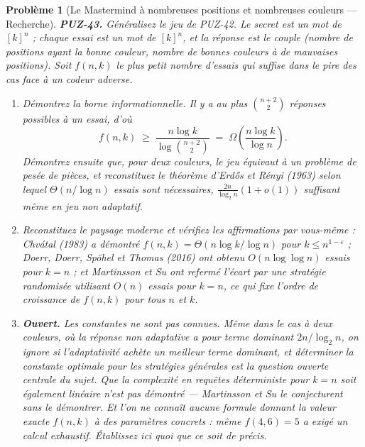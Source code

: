 \documentclass[11pt]{article}
\newtheorem{problem}{Problème}
\begin{document}
\begin{problem}[{Le Mastermind à nombreuses positions et nombreuses couleurs --- Recherche}]
\textbf{PUZ-43.} Généralisez le jeu de PUZ-42. Le secret est un mot de $ [k]^{n} $ ;
chaque essai est un mot de $ [k]^{n} $, et la réponse est le couple (nombre de positions
ayant la bonne couleur, nombre de bonnes couleurs à de mauvaises positions). Soit
$ f(n,k) $ le plus petit nombre d'essais qui suffise dans le pire des cas face à un codeur
adverse.
\begin{enumerate}
\item[(a)] Démontrez la borne informationnelle. Il y a au plus $ \binom{n+2}{2} $ réponses
possibles à un essai, d'où
\[ f(n,k) \;\ge\; \frac{n \log k}{\log \binom{n+2}{2}} \;=\; \Omega\!\left(\frac{n\log k}{\log n}\right). \]
Démontrez ensuite que, pour deux couleurs, le jeu équivaut à un problème de pesée de pièces,
et reconstituez le théorème d'Erd\H{o}s et Rényi (1963) selon lequel $ \Theta(n/\log n) $ essais
sont nécessaires, $ \frac{2n}{\log_2 n}(1+o(1)) $ suffisant même en jeu non adaptatif.
\item[(b)] Reconstituez le paysage moderne et vérifiez les affirmations par vous-même : Chvátal
(1983) a démontré $ f(n,k) = \Theta(n \log k / \log n) $ pour
$ k \le n^{1-\varepsilon} $ ; Doerr, Doerr, Spöhel et Thomas (2016) ont obtenu
$ O(n \log\log n) $ essais pour $ k = n $ ; et Martinsson et Su ont refermé l'écart par
une stratégie randomisée utilisant $ O(n) $ essais pour $ k = n $, ce qui fixe l'ordre de
croissance de $ f(n,k) $ pour tous $ n $ et $ k $.
\item[(c)] \textbf{Ouvert.} Les constantes ne sont pas connues. Même dans le cas à deux couleurs, où
la réponse non adaptative a pour terme dominant $ 2n/\log_2 n $, on ignore si l'adaptativité
achète un meilleur terme dominant, et déterminer la constante optimale pour les stratégies
générales est la question ouverte centrale du sujet. Que la complexité en requêtes
\textit{déterministe} pour $ k = n $ soit également linéaire n'est pas démontré --- Martinsson
et Su le conjecturent sans le démontrer. Et l'on ne connaît aucune formule donnant la valeur
exacte $ f(n,k) $ à des paramètres concrets : même $ f(4,6) = 5 $ a exigé un calcul
exhaustif. Établissez ici quoi que ce soit de précis.
\end{enumerate}

\end{problem}
\end{document}
